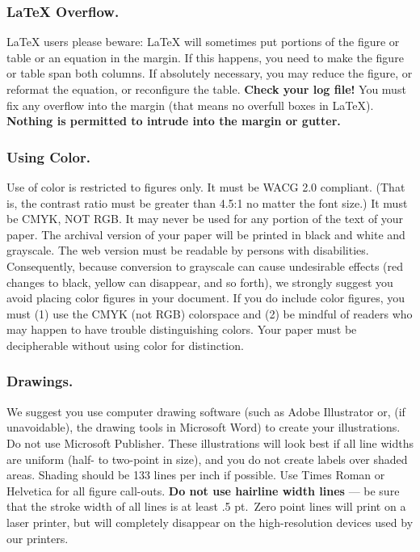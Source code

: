 \subsubsection{\LaTeX{} Overflow.}

\LaTeX{} users please beware: \LaTeX{} will sometimes put portions of
the figure or table or an equation in the margin. If this happens, you
need to make the figure or table span both columns. If absolutely
necessary, you may reduce the figure, or reformat the equation, or
reconfigure the table. \textbf{Check your log file!} You must fix any
overflow into the margin (that means no overfull boxes in \LaTeX{}).
\textbf{Nothing is permitted to intrude into the margin or gutter.}

\subsubsection{Using Color.}

Use of color is restricted to figures only. It must be WACG 2.0
compliant. (That is, the contrast ratio must be greater than 4.5:1 no
matter the font size.) It must be CMYK, NOT RGB. It may never be used
for any portion of the text of your paper. The archival version of your
paper will be printed in black and white and grayscale. The web version
must be readable by persons with disabilities. Consequently, because
conversion to grayscale can cause undesirable effects (red changes to
black, yellow can disappear, and so forth), we strongly suggest you
avoid placing color figures in your document. If you do include color
figures, you must (1) use the CMYK (not RGB) colorspace and (2) be
mindful of readers who may happen to have trouble distinguishing colors.
Your paper must be decipherable without using color for distinction.

\subsubsection{Drawings.}

We suggest you use computer drawing software (such as Adobe Illustrator
or, (if unavoidable), the drawing tools in Microsoft Word) to create
your illustrations. Do not use Microsoft Publisher. These illustrations
will look best if all line widths are uniform (half- to two-point in
size), and you do not create labels over shaded areas. Shading should be
133 lines per inch if possible. Use Times Roman or Helvetica for all
figure call-outs. \textbf{Do not use hairline width lines} --- be sure
that the stroke width of all lines is at least .5 pt.~Zero point lines
will print on a laser printer, but will completely disappear on the
high-resolution devices used by our printers.

